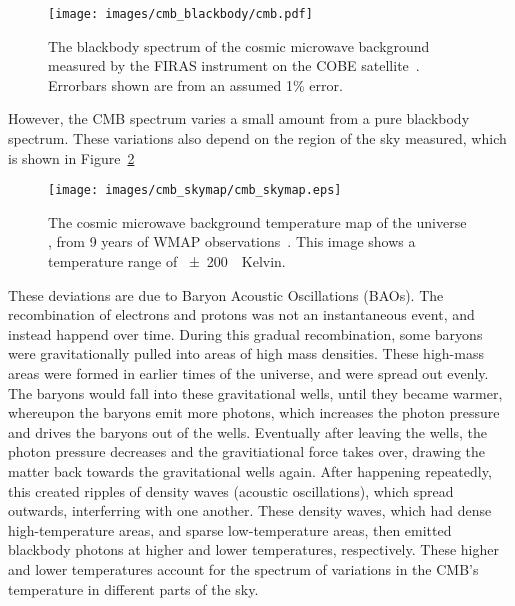     \begin{figure}[ht]
      \centering
      \texttt{[image: images/cmb\_blackbody/cmb.pdf]}
      \caption[Cosmic Microwave Background Blackbody]{
        The blackbody spectrum of the cosmic microwave background measured by the FIRAS instrument on the COBE satellite~\cite{mather1990}.
        Errorbars shown are from an assumed 1\% error.
      }
      \label{fig:cmb_black}
    \end{figure}
    
    However, the CMB spectrum varies a small amount from a pure blackbody spectrum.
    These variations also depend on the region of the sky measured, which is shown in Figure~\ref{fig:cmb}

    \begin{figure}[ht]
      \centering
      \texttt{[image: images/cmb\_skymap/cmb\_skymap.eps]}
      \caption[Cosmic Microwave Background Skymap]{
        The cosmic microwave background temperature map of the universe \cite{wmap_skymap}, from 9 years of WMAP observations~\cite{wmap9year}.
        This image shows a temperature range of \SI{\pm200}{\mu{}Kelvin}.
      }
      \label{fig:cmb}
    \end{figure}

    These deviations are due to Baryon Acoustic Oscillations (BAOs).
    The recombination of electrons and protons was not an instantaneous event, and instead happend over time.
    During this gradual recombination, some baryons were gravitationally pulled into areas of high mass densities.
    These high-mass areas were formed in earlier times of the universe, and were spread out evenly.
    The baryons would fall into these gravitational wells, until they became warmer, whereupon the baryons emit more photons, which increases the photon pressure and drives the baryons out of the wells.
    Eventually after leaving the wells, the photon pressure decreases and the gravitiational force takes over, drawing the matter back towards the gravitational wells again.
    After happening repeatedly, this created ripples of density waves (acoustic oscillations), which spread outwards, interferring with one another.
    These density waves, which had dense high-temperature areas, and sparse low-temperature areas, then emitted blackbody photons at higher and lower temperatures, respectively.
    These higher and lower temperatures account for the spectrum of variations in the CMB's temperature in different parts of the sky.
    
